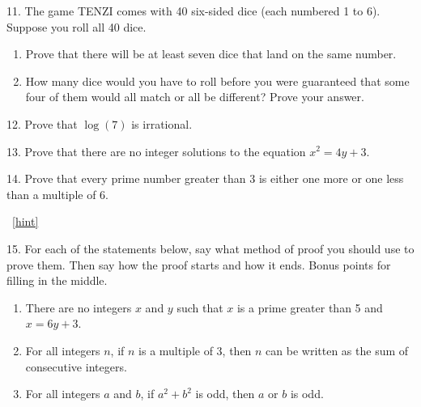\documentclass[10pt,]{book}
\theoremstyle{plain}
\theoremstyle{definition}
\theoremstyle{definition}
\theoremstyle{definition}
\numberwithin{equation}{chapter}
\begin{document}
\begin{exerciselist}
\par\smallskip
\item[11.]\hypertarget{exercise-125}{}\hypertarget{p-2550}{}%
The game TENZI comes with 40 six-sided dice (each numbered 1 to 6). Suppose you roll all 40 dice. \leavevmode%
\begin{enumerate}[label=(\alph*)]
\item\hypertarget{li-543}{}Prove that there will be at least seven dice that land on the same number.%
\item\hypertarget{li-544}{}\hypertarget{p-2551}{}%
How many dice would you have to roll before you were guaranteed that some four of them would all match or all be different? Prove your answer.%
\end{enumerate}
%
\par\smallskip
\item[12.]\hypertarget{exercise-126}{}\hypertarget{p-2557}{}%
Prove that \(\log(7)\) is irrational.%
\par\smallskip
\item[13.]\hypertarget{exercise-127}{}\hypertarget{p-2562}{}%
Prove that there are no integer solutions to the equation \(x^2 = 4y + 3\).%
\par\smallskip
\item[14.]\hypertarget{exercise-128}{}\hypertarget{p-2563}{}%
Prove that every prime number greater than 3 is either one more or one less than a multiple of 6.%
\par\smallskip
~\hfill{\tiny\hyperlink{a-B.5.14}{[hint]}\hypertarget{q-B.5.14}{}}\item[15.]\hypertarget{exercise-129}{}\hypertarget{p-2565}{}%
For each of the statements below, say what method of proof you should use to prove them. Then say how the proof starts and how it ends. Bonus points for filling in the middle.%
\par
\hypertarget{p-2566}{}%
\leavevmode%
\begin{enumerate}[label=(\alph*)]
\item\hypertarget{li-547}{}\hypertarget{p-2567}{}%
There are no integers \(x\) and \(y\) such that \(x\) is a prime greater than 5 and \(x = 6y + 3\).%
\item\hypertarget{li-548}{}\hypertarget{p-2568}{}%
For all integers \(n\), if \(n\) is a multiple of 3, then \(n\) can be written as the sum of consecutive integers.%
\item\hypertarget{li-549}{}\hypertarget{p-2569}{}%
For all integers \(a\) and \(b\), if \(a^2 + b^2\) is odd, then \(a\) or \(b\) is odd.%
\end{enumerate}

\end{exerciselist}
\end{document}
